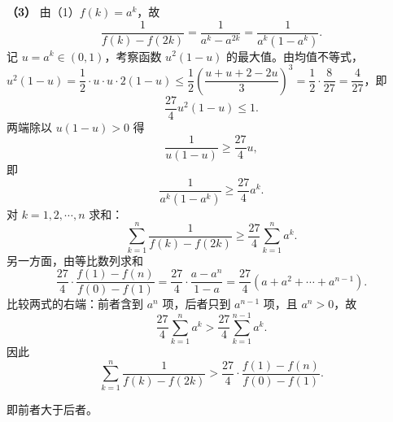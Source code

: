 \begin{answer}
\textbf{（3）} 由（1）$f(k)=a^k$，故
\nopagebreak[4]
\[\frac1{f(k)-f(2k)}=\frac1{a^k-a^{2k}}=\frac1{a^k\left(1-a^k\right)}.\]
记 $u=a^k\in(0,1)$，考察函数 $u^2(1-u)$ 的最大值。由均值不等式，$u^2(1-u)=\dfrac12\cdot u\cdot u\cdot2(1-u)\leqslant\dfrac12\left(\dfrac{u+u+2-2u}3\right)^3=\dfrac12\cdot\dfrac8{27}=\dfrac4{27}$，即
\nopagebreak[4]
\[\frac{27}4u^2(1-u)\leqslant1.\]
两端除以 $u(1-u)>0$ 得
\nopagebreak[4]
\[\frac1{u(1-u)}\geqslant\frac{27}4u,\]
即
\nopagebreak[4]
\[\frac1{a^k\left(1-a^k\right)}\geqslant\frac{27}4a^k.\]
对 $k=1,2,\cdots,n$ 求和：
\nopagebreak[4]
\[\sum_{k=1}^n\frac1{f(k)-f(2k)}\geqslant\frac{27}4\sum_{k=1}^na^k.\]
另一方面，由等比数列求和
\nopagebreak[4]
\[\frac{27}4\cdot\frac{f(1)-f(n)}{f(0)-f(1)}=\frac{27}4\cdot\frac{a-a^n}{1-a}=\frac{27}4\left(a+a^2+\cdots+a^{n-1}\right).\]
比较两式的右端：前者含到 $a^n$ 项，后者只到 $a^{n-1}$ 项，且 $a^n>0$，故
\nopagebreak[4]
\[\frac{27}4\sum_{k=1}^na^k>\frac{27}4\sum_{k=1}^{n-1}a^k.\]
因此
\nopagebreak[4]
\[\sum_{k=1}^{n}\frac1{f(k)-f(2k)}>\frac{27}4\cdot\frac{f(1)-f(n)}{f(0)-f(1)}.\]

即前者大于后者。




\end{answer}